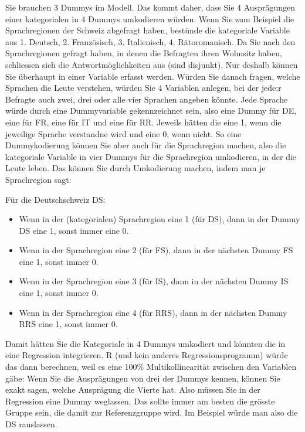 \documentclass[
  10pt,
  letterpaper,
  a4paper, twoside]{scrreprt}
\providecommand{\tightlist}{%
  \setlength{\itemsep}{0pt}\setlength{\parskip}{0pt}}\usepackage{longtable,booktabs,array}
\begin{document}
\begin{tcolorbox}[enhanced jigsaw, coltitle=black, opacitybacktitle=0.6, toptitle=1mm, colbacktitle=quarto-callout-important-color!10!white, colback=white, toprule=.15mm, opacityback=0, bottomrule=.15mm, arc=.35mm, colframe=quarto-callout-important-color-frame, leftrule=.75mm, titlerule=0mm, breakable, left=2mm, rightrule=.15mm, title={Q\&A: Wie viele Dummyvariablen brauchen Sie, um die volle Information
einer kategorialen Variablen mit vier Ausprägungen abzubilden?}, bottomtitle=1mm]

Sie brauchen 3 Dummys im Modell. Das kommt daher, dass Sie 4
Ausprägungen einer kategorialen in 4 Dummys umkodieren würden. Wenn Sie
zum Beispiel die Sprachregionen der Schweiz abgefragt haben, bestünde
die kategoriale Variable aus 1. Deutsch, 2. Französisch, 3. Italienisch,
4. Rätoromanisch. Da Sie nach den Sprachregionen gefragt haben, in denen
die Befragten ihren Wohnsitz haben, schliessen sich die
Antwortmöglichkeiten aus (sind disjunkt). Nur deshalb können Sie
überhaupt in einer Variable erfasst werden. Würden Sie danach fragen,
welche Sprachen die Leute verstehen, würden Sie 4 Variablen anlegen, bei
der jede:r Befragte auch zwei, drei oder alle vier Sprachen angeben
könnte. Jede Sprache würde durch eine Dummyvariable gekennzeichnet sein,
also eine Dummy für DE, eine für FR, eine für IT und eine für RR.
Jeweils hätten die eine 1, wenn die jeweilige Sprache verstandne wird
und eine 0, wenn nicht. So eine Dummykodierung können Sie aber auch für
die Sprachregion machen, also die kategoriale Variable in vier Dummys
für die Sprachregion umkodieren, in der die Leute leben. Das können Sie
durch Umkodierung machen, indem man je Sprachregion sagt:

Für die Deutschschweiz DS:

\begin{itemize}
\tightlist
\item
  Wenn in der (kategorialen) Sprachregion eine 1 (für DS), dann in der
  Dummy DS eine 1, sonst immer eine 0.
\item
  Wenn in der Sprachregion eine 2 (für FS), dann in der nächsten Dummy
  FS eine 1, sonst immer 0.
\item
  Wenn in der Sprachregion eine 3 (für IS), dann in der nächsten Dummy
  IS eine 1, sonst immer 0.
\item
  Wenn in der Sprachregion eine 4 (für RRS), dann in der nächsten Dummy
  RRS eine 1, sonst immer 0.
\end{itemize}

Damit hätten Sie die Kategoriale in 4 Dummys umkodiert und könnten die
in eine Regression integrieren. R (und kein anderes Regressionsprogramm)
würde das dann berechnen, weil es eine 100\% Multikollinearität zwischen
den Variablen gäbe: Wenn Sie die Ausprägungen von drei der Dummys
kennen, können Sie exakt sagen, welche Ausprägung die Vierte hat. Also
müssen Sie in der Regression eine Dummy weglassen. Das sollte immer am
besten die grösste Gruppe sein, die damit zur Referenzgruppe wird. Im
Beispiel würde man also die DS rauslassen.


\end{tcolorbox}
\end{document}
